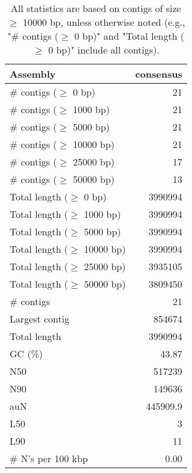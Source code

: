 \documentclass[12pt,a4paper]{article}
\begin{document}
\begin{table}[ht]
\begin{center}
\caption{All statistics are based on contigs of size $\geq$ 10000 bp, unless otherwise noted (e.g., "\# contigs ($\geq$ 0 bp)" and "Total length ($\geq$ 0 bp)" include all contigs).}
\begin{tabular}{|l*{1}{|r}|}
\hline
Assembly & consensus \\ \hline
\# contigs ($\geq$ 0 bp) & 21 \\ \hline
\# contigs ($\geq$ 1000 bp) & 21 \\ \hline
\# contigs ($\geq$ 5000 bp) & 21 \\ \hline
\# contigs ($\geq$ 10000 bp) & 21 \\ \hline
\# contigs ($\geq$ 25000 bp) & 17 \\ \hline
\# contigs ($\geq$ 50000 bp) & 13 \\ \hline
Total length ($\geq$ 0 bp) & 3990994 \\ \hline
Total length ($\geq$ 1000 bp) & 3990994 \\ \hline
Total length ($\geq$ 5000 bp) & 3990994 \\ \hline
Total length ($\geq$ 10000 bp) & 3990994 \\ \hline
Total length ($\geq$ 25000 bp) & 3935105 \\ \hline
Total length ($\geq$ 50000 bp) & 3809450 \\ \hline
\# contigs & 21 \\ \hline
Largest contig & 854674 \\ \hline
Total length & 3990994 \\ \hline
GC (\%) & 43.87 \\ \hline
N50 & 517239 \\ \hline
N90 & 149636 \\ \hline
auN & 445909.9 \\ \hline
L50 & 3 \\ \hline
L90 & 11 \\ \hline
\# N's per 100 kbp & 0.00 \\ \hline
\end{tabular}
\end{center}
\end{table}
\end{document}
